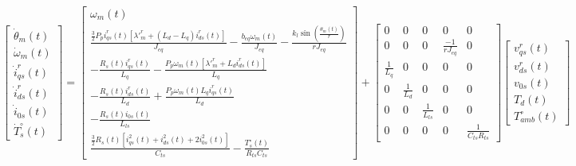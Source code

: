 \documentclass[a4paper, 10pt, onecolumn,journal]{ieeeconf}
\begin{document}
\begin{equation}
    \begin{bmatrix} 
        \dot{\theta}_m(t) \\ 
        \dot{\omega}_m(t) \\ 
        \dot{i}^r_{qs}(t) \\ 
        \dot{i}^r_{ds}(t) \\ 
        \dot{i}_{0s}(t) \\ 
        \dot{T}^\circ_s(t) 
    \end{bmatrix} 
        = 
    \begin{bmatrix} 
        \omega_m(t) \\ 
        \frac{\frac{3}{2} P_p i^r_{qs}(t)\left[\lambda'^r_m + (L_d - L_q) i^r_{ds}(t) \right]}{J_{eq}} - \frac{b_{eq}\omega_m(t)}{J_{eq}} - \frac{k_l\sin\left(\frac{\theta_m(t)}{r}\right)}{rJ_{eq}}\\ 
        -\frac{R_s(t) i^r_{qs}(t)}{L_q} - \frac{P_p \omega_m(t) \left[\lambda'^r_m + L_d i^r_{ds}(t)\right]}{L_q}\\ 
        -\frac{R_s(t) i^r_{ds}(t)}{L_d} + \frac{P_p \omega_m(t) L_q  i^r_{qs}(t)}{L_d}  \\ 
        -\frac{R_s(t) i_{0s}(t) }{L_{ls}} \\ 
        \frac{\frac{3}{2} R_s(t) \left[ i_{qs}^2(t) + i_{ds}^2(t) + 2 i_{0s}^2(t) \right]}{C_{ts}} - \frac{T_s^{\circ}(t)}{R_{ts}C_{ts}}
    \end{bmatrix}
        + 
    \begin{bmatrix} 
        0 & 0 & 0 & 0 & 0 \\ 
        0 & 0 & 0 & \frac{-1}{r J_{eq}} & 0 \\ 
        \frac{1}{L_q} & 0 & 0 & 0 & 0\\ 
        0 & \frac{1}{L_d} & 0 & 0 & 0 \\ 
        0 & 0 & \frac{1}{L_{ls}}  & 0 & 0 \\ 
        0 & 0 & 0 & 0 & \frac{1}{C_{ts} R_{ts}}
    \end{bmatrix} 
    \begin{bmatrix} 
        v^r_{qs}(t) \\ 
        v^r_{ds}(t) \\ 
        v_{0s}(t) \\
        T_d(t) \\ 
        T^{\circ}_{amb}(t)
    \end{bmatrix}
    \label{ecuacion vectorial de estado jacobi}
\end{equation}
\end{document}
